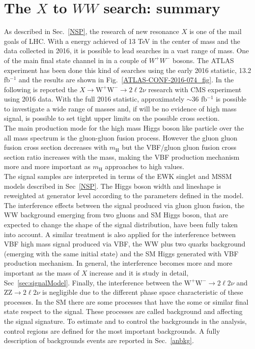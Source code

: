 
\section{The $X$ to $WW$ search: summary}\label{sec:AnalysisStrategy_Intro}
As described in Sec.~\ref{NSP}, the research of  new resonance $X$ is one of the mail goals of LHC. With a energy achieved of 13 TeV in the center of mass and the data collected in 2016, it is possible to lead searches in a vast range of mass. One of the main final state channel in in a couple of $W^+W^-$ bosons.
The ATLAS experiment has been done this kind of searches using the early 2016 statistic, 13.2 fb$^{-1}$ and the results are shown in Fig.~\ref{ATLAS-CONF-2016-074_fig}. In the following is reported the $X \to \mathrm{W^+W^-}\to2\ell2\nu$ research with CMS experiment using 2016 data.
With the full 2016 statistic, approximately $\sim 36$ fb$^{-1}$ is possible to investigate a wide range of masses and, if will be no evidence of high mass signal, is possible to set  tight upper limits on the possible cross section. \\
\newline
The main production mode for the high mass Higgs boson like particle over the all mass spectrum is the gluon-gluon fusion process. 
However the  gluon gluon fusion cross section decreases with $m_\mathrm{H}$ but the VBF/gluon gluon fusion cross section ratio increases with the mass, making the VBF production mechanism more and more important as $m_\mathrm{H}$ approaches to high values.\\
The signal samples are interpreted in terms of the EWK singlet and MSSM models described in Sec~\ref{NSP}. 
The Higgs boson width and lineshape is reweighted at generator level according to the parameters defined in the model.
The interference effects between the signal produced  via gluon gluon fusion, the WW background emerging from two gluons and SM
Higgs boson, that are expected to change the shape of the signal distribution, have been fully taken into account. 
A similar treatment is also applied for the interference between VBF high mass signal produced via VBF, the  WW plus two quarks background (emerging with the same initial state)  and the SM Higgs generated with  VBF production mechanism. In general, the interference becomes more and more important as the mass of $X$ increase and it is study in detail, Sec~\ref{sec:signalModel}.
Finally, the interference between the $\mathrm{W^+W^-}\to2\ell2\nu$ and $\mathrm{ZZ}\to2\ell2\nu$ is negligible due to the different phase space characteristic of these processes. In the SM there are some processes that have the some or similar final state respect to the signal. These processes are called background and affecting the signal signature. To estimate and to control the backgrounds in the analysis, control regions are defined for the most important backgrounds. A fully description of backgrounds events are reported in Sec.~\ref{anbkg}. \\
